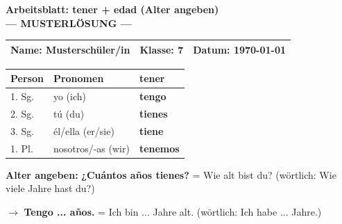 \documentclass[11pt, a4paper]{article}
\newcommand{\fachfarbe}{spanisch}
\newcommand{\thema}{tener + edad (Alter angeben)}
\newcommand{\klasse}{7}
\newcommand{\datum}{\today}
\newcommand{\loesung}[1]{\textcolor{loesung}{\textbf{#1}}}
\newcommand{\es}[1]{\textcolor{\fachfarbe}{\textbf{#1}}}
\begin{document}
\begin{center}
    {\Large\bfseries\textcolor{\fachfarbe}{Arbeitsblatt: \thema}}\\[0.3em]
    {\large\textcolor{loesung}{\textbf{--- MUSTERLÖSUNG ---}}}
\end{center}

\vspace{5pt}

\noindent
\begin{tabularx}{\textwidth}{|X|X|X|}
\hline
\textbf{Name:} \textcolor{loesung}{Musterschüler/in} &
\textbf{Klasse:} \klasse &
\textbf{Datum:} \datum \\
\hline
\end{tabularx}

\vspace{15pt}


\begin{merkkasten}

\begin{center}
\begin{tabular}{|l|l|l|}
\hline
\textbf{Person} & \textbf{Pronomen} & \textbf{tener} \\
\hline
1. Sg. & yo (ich) & \loesung{tengo} \\
\hline
2. Sg. & tú (du) & \loesung{tienes} \\
\hline
3. Sg. & él/ella (er/sie) & \loesung{tiene} \\
\hline
1. Pl. & nosotros/-as (wir) & \loesung{tenemos} \\
\hline
\end{tabular}
\end{center}

\vspace{0.5em}

\textbf{Alter angeben:} \es{¿Cuántos años tienes?} = Wie alt bist du? (wörtlich: Wie viele Jahre hast du?)

\vspace{0.3em}

$\rightarrow$ \es{Tengo ... años.} = Ich bin ... Jahre alt. (wörtlich: Ich habe ... Jahre.)

\end{merkkasten}

\vspace{10pt}
\end{document}
